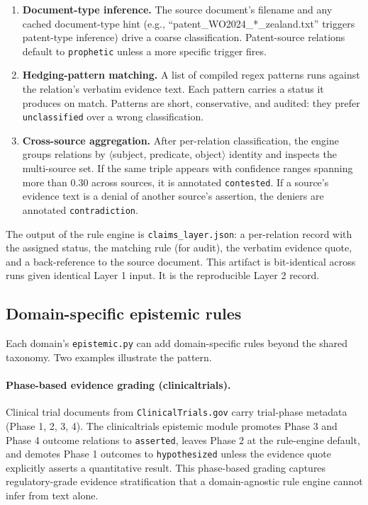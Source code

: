 \begin{enumerate}
\item \textbf{Document-type inference.} The source document's filename and any cached document-type hint (e.g., ``patent\_{}WO2024\_*\_zealand.txt'' triggers patent-type inference) drive a coarse classification. Patent-source relations default to \texttt{prophetic} unless a more specific trigger fires.
\item \textbf{Hedging-pattern matching.} A list of compiled regex patterns runs against the relation's verbatim evidence text. Each pattern carries a status it produces on match. Patterns are short, conservative, and audited: they prefer \texttt{unclassified} over a wrong classification.
\item \textbf{Cross-source aggregation.} After per-relation classification, the engine groups relations by $\langle$subject, predicate, object$\rangle$ identity and inspects the multi-source set. If the same triple appears with confidence ranges spanning more than 0.30 across sources, it is annotated \texttt{contested}. If a source's evidence text is a denial of another source's assertion, the deniers are annotated \texttt{contradiction}.
\end{enumerate}

The output of the rule engine is \texttt{claims\_layer.json}: a per-relation record with the assigned status, the matching rule (for audit), the verbatim evidence quote, and a back-reference to the source document. This artifact is bit-identical across runs given identical Layer 1 input. It is the reproducible Layer 2 record.

\subsection{Domain-specific epistemic rules}

Each domain's \texttt{epistemic.py} can add domain-specific rules beyond the shared taxonomy. Two examples illustrate the pattern.

\paragraph{Phase-based evidence grading (clinicaltrials).} Clinical trial documents from \texttt{ClinicalTrials.gov} carry trial-phase metadata (Phase 1, 2, 3, 4). The clinicaltrials epistemic module promotes Phase 3 and Phase 4 outcome relations to \texttt{asserted}, leaves Phase 2 at the rule-engine default, and demotes Phase 1 outcomes to \texttt{hypothesized} unless the evidence quote explicitly asserts a quantitative result. This phase-based grading captures regulatory-grade evidence stratification that a domain-agnostic rule engine cannot infer from text alone.

